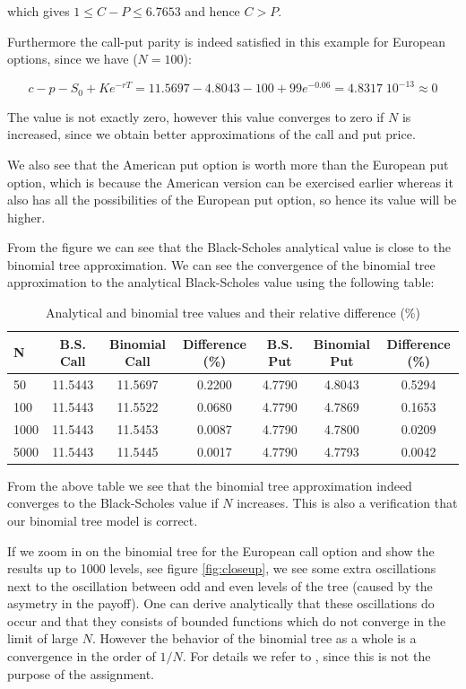 \documentclass[11pt,a4paper]{article}
\begin{document}
which gives $1 \leq C - P \leq 6.7653$ and hence $C > P$.

Furthermore the call-put parity is indeed satisfied in this example for European options, since we have ($N = 100$):

\begin{equation}
  c - p - S_{0} + K e^{-rT} = 11.5697 - 4.8043 - 100 + 99 e^{-0.06} = 4.8317 \;  10^{-13} \approx 0
\end{equation}

The value is not exactly zero, however this value converges to zero if $N$ is increased, since we obtain better approximations of the call and put price.

We also see that the American put option is worth more than the European put option, which is because the American version can be exercised earlier whereas it also has all the possibilities of the European put option, so hence its value will be higher.

From the figure we can see that the Black-Scholes analytical value is close to the binomial tree approximation. We can see the convergence of the binomial tree approximation to the analytical Black-Scholes value using the following table:

\begin{table}[H]
  \centering
  \begin{tabular}{l || c | c | c | c | c | c}
    N & B.S. Call & Binomial Call & Difference (\%) & B.S. Put & Binomial Put & Difference (\%)\\
    \hline
    50 & 11.5443 & 11.5697 & 0.2200 & 4.7790 & 4.8043 & 0.5294 \\
    100 & 11.5443 & 11.5522 & 0.0680 & 4.7790 & 4.7869 & 0.1653 \\
    1000 & 11.5443 & 11.5453 & 0.0087 & 4.7790 & 4.7800 & 0.0209 \\
    5000 & 11.5443 & 11.5445 & 0.0017 & 4.7790 & 4.7793 & 0.0042 \\ 
  \end{tabular}
  \caption{Analytical and binomial tree values and their relative difference (\%)}
  \label{tab:diff}
\end{table}

From the above table we see that the binomial tree approximation indeed converges to the Black-Scholes value if $N$ increases. This is also a verification that our binomial tree model is correct.

If we zoom in on the binomial tree for the European call option and show the results up to 1000 levels, see figure \ref{fig:closeup}, we see some extra oscillations next to the oscillation between odd and even levels of the tree (caused by the asymetry in the payoff). One can derive analytically that these oscillations do occur and that they consists of bounded functions which do not converge in the limit of large $N$. However the behavior of the binomial tree as a whole is a convergence in the order of $1/N$. For details we refer to \cite{diener}, since this is not the purpose of the assignment.
\end{document}
